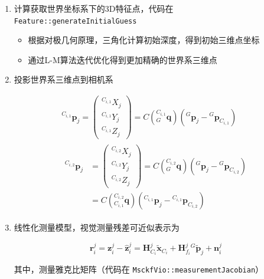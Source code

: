 \documentclass[12pt,a4paper]{article}
\begin{document}
\begin{enumerate}

\item 计算获取世界坐标系下的3D特征点，代码在 \verb|Feature::generateInitialGuess|

\begin{itemize}
\item 根据对极几何原理，三角化计算初始深度，得到初始三维点坐标
\item 通过L-M算法迭代优化得到更加精确的世界系三维点
\end{itemize}

\item 投影世界系三维点到相机系

\begin{equation*}
\begin{gathered}
{}^{C_{i, 1}}\mathbf{p}_j = 
\begin{pmatrix}
{}^{C_{i, 1}}X_j \\ {}^{C_{i, 1}}Y_j \\ {}^{C_{i, 1}}Z_j
\end{pmatrix} = 
C\left({}^{C_{i, 1}}_G\mathbf{q}\right)
\left({}^G\mathbf{p}_j-{}^G\mathbf{p}_{C_{i, 1}}\right) \\
\begin{aligned}
{}^{C_{i, 2}}\mathbf{p}_j &= 
\begin{pmatrix}
{}^{C_{i, 2}}X_j \\ {}^{C_{i, 2}}Y_j \\ {}^{C_{i, 2}}Z_j
\end{pmatrix} = 
C\left({}^{C_{i, 2}}_G\mathbf{q}\right)
\left({}^G\mathbf{p}_j-{}^G\mathbf{p}_{C_{i, 2}}\right) \\
&= C\left({}^{C_{i, 2}}_{C_{i, 1}}\mathbf{q}\right)
\left({}^{C_{i, 1}}\mathbf{p}_j - 
{}^{C_{i, 1}}\mathbf{p}_{C_{i, 2}}\right)
\end{aligned}
\end{gathered}
\end{equation*} 

\item 线性化测量模型，视觉测量残差可近似表示为

\begin{equation}
\mathbf{r}^j_i = 
\mathbf{z}_i^j - \hat{\mathbf{z}}_i^j = 
\mathbf{H}_{C_i}^j\tilde{\mathbf{x}}_{C_i} + 
\mathbf{H}_{f_i}^j{}^G\tilde{\mathbf{p}}_{j} + 
\mathbf{n}_i^j
\end{equation}

其中，测量雅克比矩阵（代码在 \verb|MsckfVio::measurementJacobian|）


\end{enumerate}
\end{document}
